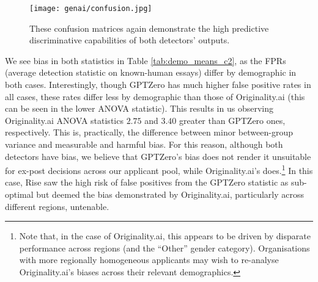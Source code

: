 \begin{figure}[htb]
  \centering
  \texttt{[image: genai/confusion.jpg]}
  \caption{These confusion matrices again demonstrate the high predictive discriminative capabilities of both detectors' outputs.}
  \label{fig:confusion}
\end{figure}

We see bias in both statistics in Table \ref{tab:demo_means_c2}, as the FPRs (average detection statistic on known-human essays) differ by demographic in both cases. Interestingly, though GPTZero has much higher false positive rates in all cases, these rates differ less by demographic than those of Originality.ai (this can be seen in the lower ANOVA statistic). This results in us observing Originality.ai ANOVA statistics $2.75$ and $3.40$ greater than GPTZero ones, respectively. This is, practically, the difference between minor between-group variance and measurable and harmful bias. For this reason, although both detectors have bias, we believe that GPTZero's bias does not render it unsuitable for ex-post decisions across our applicant pool, while Originality.ai's does.\footnote{Note that, in the case of Originality.ai, this appears to be driven by disparate performance across regions (and the ``Other'' gender category). Organisations with more regionally homogeneous applicants may wish to re-analyse Originality.ai's biases across their relevant demographics.} In this case, Rise saw the high risk of false positives from the GPTZero statistic as sub-optimal but deemed the bias demonstrated by Originality.ai, particularly across different regions, untenable.

